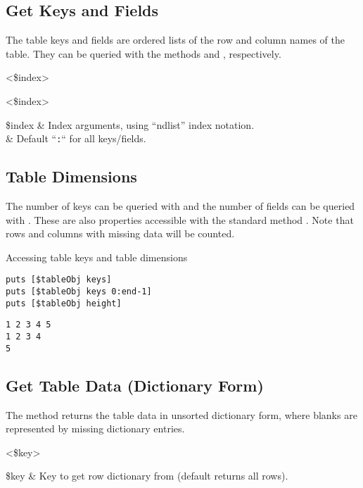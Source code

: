 \documentclass{article}
\begin{document}
\subsection{Get Keys and Fields}
The table keys and fields are ordered lists of the row and column names of the table.
They can be queried with the methods  and , respectively. 
\begin{syntax}
 <\$index>
\end{syntax}
\begin{syntax}
 <\$index>
\end{syntax}
\begin{args}
\$index & Index arguments, using ``ndlist'' index notation. \\
& Default ``\texttt{:}`` for all keys/fields.
\end{args}
\subsection{Table Dimensions}
The number of keys can be queried with  and the number of fields can be queried with . 
These are also properties accessible with the standard method .
Note that rows and columns with missing data will be counted.
\begin{syntax}
\end{syntax}
\begin{syntax}
\end{syntax}

\begin{example}{Accessing table keys and table dimensions}
\begin{lstlisting}
puts [$tableObj keys]
puts [$tableObj keys 0:end-1]
puts [$tableObj height]
\end{lstlisting}
\tcblower
\begin{lstlisting}
1 2 3 4 5
1 2 3 4
5
\end{lstlisting}
\end{example}
\clearpage
\subsection{Get Table Data (Dictionary Form)}
The method  returns the table data in unsorted dictionary form, where blanks are represented by missing dictionary entries. 
\begin{syntax}
 <\$key>
\end{syntax}
\begin{args}
\$key & Key to get row dictionary from (default returns all rows). 
\end{args}
\end{document}
